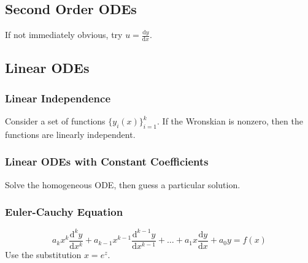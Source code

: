 \documentclass{article}
\begin{document}
\subsection{Second Order ODEs}
If not immediately obvious, try $u = \frac{\mathrm{d}y}{\mathrm{d}x}$.

\subsection{Linear ODEs}

\subsubsection{Linear Independence}
Consider a set of functions $\{y_i(x)\}_{i=1}^{k}$. If the Wronskian is nonzero, then the functions are linearly independent.

\subsubsection{Linear ODEs with Constant Coefficients}
Solve the homogeneous ODE, then guess a particular solution.

\subsubsection{Euler-Cauchy Equation}
\begin{equation*}
    a_k x^k \frac{\mathrm{d}^k y}{\mathrm{d} x^k} + a_{k-1} x^{k-1} \frac{\mathrm{d}^{k-1} y}{\mathrm{d} x^{k-1}} + \ldots + a_1 x \frac{\mathrm{d}y}{\mathrm{d}x} + a_0 y = f(x)
\end{equation*}
Use the substitution $x = e^z$.
\end{document}
